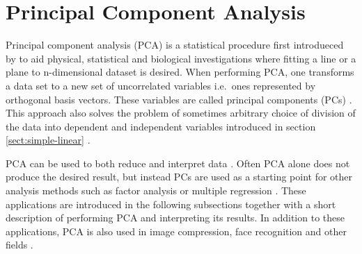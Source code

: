 \documentclass[english, oneside]{HYgradu}
\begin{document}







\section{Principal Component Analysis}
Principal component analysis (PCA) is a statistical procedure first introdueced by \citet{pearson1901lines} to aid physical, statistical and biological investigations where fitting a line or a plane to n-dimensional dataset is desired. When performing PCA, one transforms a data set to a new set of uncorrelated variables i.e.\ ones represented by orthogonal basis vectors. These variables are called principal components (PCs) \citep{jolliffe2002principal}. This approach also solves the problem of sometimes arbitrary choice of division of the data into dependent and independent variables introduced in section \ref{sect:simple-linear} \citep{pearson1901lines}. 

PCA can be used to both reduce and interpret data \citep{johnson2007applied}. Often PCA alone does not produce the desired result, but instead PCs are used as a starting point for other analysis methods such as factor analysis or multiple regression \citep{johnson2007applied}. These applications are introduced in the following subsections together with a short description of performing PCA and interpreting its results. In addition to  these applications, PCA is also used in image compression, face recognition and other fields \citep{smith2002tutorial}.
\end{document}

